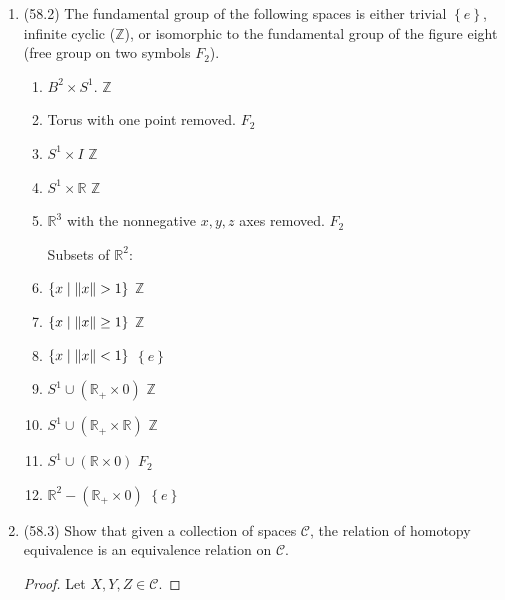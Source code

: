 \documentclass[11pt]{article}
\newcommand{\cbr}[1]{\left\{#1\right\}}
\begin{document}
\begin{enumerate}
\begin{proof}
      Hence $g$ is surjective.
    \end{proof}
    \item (58.2) The fundamental group of the following spaces is either trivial $\cbr{e}$, infinite cyclic ($\mathbb{Z}$), or isomorphic to the fundamental group of the figure eight (free group on two symbols $F_2$). \begin{enumerate}
      \item $B^2\times S^1$. \hspace*{1cm} $\mathbb{Z}$
      \item Torus with one point removed. \hspace*{1cm} $F_2$
      \item $S^1\times I$ \hspace*{1cm} $\mathbb{Z}$
      \item $S^1\times \mathbb{R}$ \hspace*{1cm} $\mathbb{Z}$
      \item $\mathbb{R}^3$ with the nonnegative $x,y,z$ axes removed. \hspace*{1cm} $F_2$
      
      Subsets of $\mathbb{R}^2$:
      \item $\cbr{x\mid \norm{x}>1}$ \hspace*{1cm} $\mathbb{Z}$
      \item $\cbr{x\mid \norm{x}\geq 1}$ \hspace*{1cm} $\mathbb{Z}$
      \item $\cbr{x\mid \norm{x}<1}$ \hspace*{1cm} $\cbr{e}$
      \item $S^1\cup (\mathbb{R}_+\times 0)$ \hspace*{1cm} $\mathbb{Z}$
      \item $S^1\cup (\mathbb{R}_+\times \mathbb{R})$ \hspace*{1cm} $\mathbb{Z}$
      \item $S^1\cup (\mathbb{R}\times 0)$ \hspace*{1cm} $F_2$
      \item $\mathbb{R}^2 - (\mathbb{R}_+\times 0)$ \hspace*{1cm} $\cbr{e}$
    \end{enumerate}
    \item (58.3) Show that given a collection of spaces $\mathcal{C}$, the relation of homotopy equivalence is an equivalence relation on $\mathcal{C}$.
    \begin{proof}
      Let $X,Y,Z\in \mathcal{C}$.
      

\end{proof}
\end{enumerate}
\end{document}

